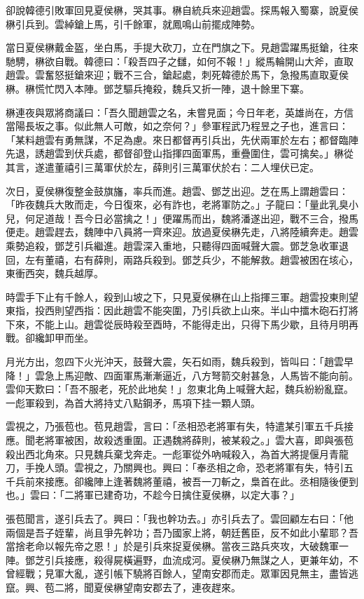 卻說韓德引敗軍回見夏侯楙，哭其事。楙自統兵來迎趙雲。探馬報入蜀寨，說夏侯楙引兵到。雲綽鎗上馬，引千餘軍，就鳳鳴山前擺成陣勢。

當日夏侯楙戴金盔，坐白馬，手提大砍刀，立在門旗之下。見趙雲躍馬挺鎗，往來馳騁，楙欲自戰。韓德曰：「殺吾四子之讎，如何不報！」縱馬輪開山大斧，直取趙雲。雲奮怒挺鎗來迎；戰不三合，鎗起處，刺死韓德於馬下，急撥馬直取夏侯楙。楙慌忙閃入本陣。鄧芝驅兵掩殺，魏兵又折一陣，退十餘里下寨。

楙連夜與眾將商議曰：「吾久聞趙雲之名，未嘗見面；今日年老，英雄尚在，方信當陽長坂之事。似此無人可敵，如之奈何？」參軍程武乃程昱之子也，進言曰：「某料趙雲有勇無謀，不足為慮。來日都督再引兵出，先伏兩軍於左右；都督臨陣先退，誘趙雲到伏兵處，都督卻登山指揮四面軍馬，重疊圍住，雲可擒矣。」楙從其言，遂遣董禧引三萬軍伏於左，薛則引三萬軍伏於右：二人埋伏已定。

次日，夏侯楙復整金鼓旗旛，率兵而進。趙雲、鄧芝出迎。芝在馬上謂趙雲曰：「昨夜魏兵大敗而走，今日復來，必有詐也，老將軍防之。」子龍曰：「量此乳臭小兒，何足道哉！吾今日必當擒之！」便躍馬而出，魏將潘遂出迎，戰不三合，撥馬便走。趙雲趕去，魏陣中八員將一齊來迎。放過夏侯楙先走，八將陸續奔走。趙雲乘勢追殺，鄧芝引兵繼進。趙雲深入重地，只聽得四面喊聲大震。鄧芝急收軍退回，左有董禧，右有薛則，兩路兵殺到。鄧芝兵少，不能解救。趙雲被困在垓心，東衝西突，魏兵越厚。

時雲手下止有千餘人，殺到山坡之下，只見夏侯楙在山上指揮三軍。趙雲投東則望東指，投西則望西指：因此趙雲不能突圍，乃引兵欲上山來。半山中擂木砲石打將下來，不能上山。趙雲從辰時殺至酉時，不能得走出，只得下馬少歇，且待月明再戰。卻纔卸甲而坐。

月光方出，忽四下火光沖天，鼓聲大震，矢石如雨，魏兵殺到，皆叫曰：「趙雲早降！」雲急上馬迎敵、四面軍馬漸漸逼近，八方弩箭交射甚急，人馬皆不能向前。雲仰天歎曰：「吾不服老，死於此地矣！」忽東北角上喊聲大起，魏兵紛紛亂竄。一彪軍殺到，為首大將持丈八點鋼矛，馬項下挂一顆人頭。

雲視之，乃張苞也。苞見趙雲，言曰：「丞相恐老將軍有失，特遣某引軍五千兵接應。聞老將軍被困，故殺透重圍。正遇魏將薛則，被某殺之。」雲大喜，即與張苞殺出西北角來。只見魏兵棄戈奔走。一彪軍從外吶喊殺入，為首大將提偃月青龍刀，手挽人頭。雲視之，乃關興也。興曰：「奉丞相之命，恐老將軍有失，特引五千兵前來接應。卻纔陣上逢著魏將董禧，被吾一刀斬之，梟首在此。丞相隨後便到也。」雲曰：「二將軍已建奇功，不趁今日擒住夏侯楙，以定大事？」

張苞聞言，遂引兵去了。興曰：「我也幹功去。」亦引兵去了。雲回顧左右曰：「他兩個是吾子姪輩，尚且爭先幹功；吾乃國家上將，朝廷舊臣，反不如此小輩耶？吾當捨老命以報先帝之恩！」於是引兵來捉夏侯楙。當夜三路兵夾攻，大破魏軍一陣。鄧芝引兵接應，殺得屍橫遍野，血流成河。夏侯楙乃無謀之人，更兼年幼，不曾經戰；見軍大亂，遂引帳下驍將百餘人，望南安郡而走。眾軍因見無主，盡皆逃竄。興、苞二將，聞夏侯楙望南安郡去了，連夜趕來。

